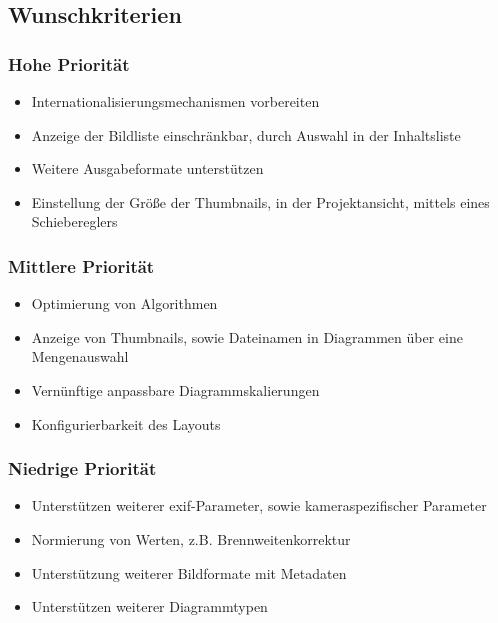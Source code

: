 \subsection{Wunschkriterien} 

\subsubsection{Hohe Priorität}

	\begin{itemize}
		\item Internationalisierungsmechanismen vorbereiten
		\item Anzeige der Bildliste einschränkbar, durch Auswahl in der Inhaltsliste
		\item Weitere Ausgabeformate unterstützen 
		\item Einstellung der Größe der Thumbnails, in der Projektansicht, mittels eines Schiebereglers
	\end{itemize}

\subsubsection{Mittlere Priorität}

	\begin{itemize}
		\item Optimierung von Algorithmen
		\item Anzeige von Thumbnails, sowie Dateinamen in Diagrammen über eine Mengenauswahl
		\item Vernünftige anpassbare Diagrammskalierungen
		\item Konfigurierbarkeit des Layouts	
	\end{itemize}

\subsubsection{Niedrige Priorität}

	\begin{itemize}
		\item Unterstützen weiterer \gls{exif}-Parameter, sowie kameraspezifischer Parameter
		\item Normierung von Werten, z.B. Brennweitenkorrektur
		\item Unterstützung weiterer Bildformate mit Metadaten 	
		\item Unterstützen weiterer Diagrammtypen
	\end{itemize}

